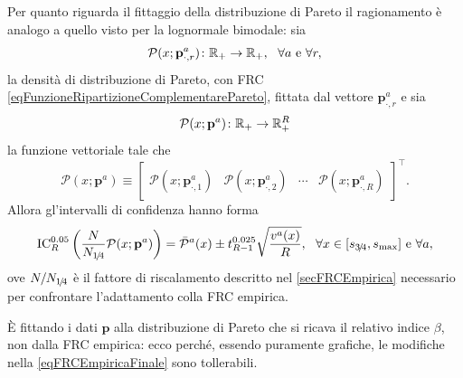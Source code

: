                 Per quanto riguarda il fittaggio della distribuzione di Pareto il ragionamento è analogo a quello visto per la lognormale bimodale: sia
                \begin{equation*}
                    \mathcal P(x;\mathbf p^a_{\cdot,r})\colon\mathbb R_+\to\mathbb R_+,
                    \ \ \forall a\text{ e }\forall r,
                \end{equation*}
                la densità di distribuzione di Pareto, con FRC \cref{eqFunzioneRipartizioneComplementarePareto}, fittata dal vettore \(\mathbf p^a_{\cdot,r}\) e sia
                \begin{equation*}
                    \mathcal P(x;\mathbf p^a)\colon\mathbb R_+\to\mathbb R_+^R
                \end{equation*}
                la funzione vettoriale tale che
                \begin{equation*}
                    \mathcal P(x;\mathbf p^a)\equiv
                    \begin{bmatrix}
                        \mathcal P(x;\mathbf p^a_{\cdot,1})&
                        \mathcal P(x;\mathbf p^a_{\cdot,2})&
                        \cdots&
                        \mathcal P(x;\mathbf p^a_{\cdot,R})
                    \end{bmatrix}^\top.
                \end{equation*}
                Allora gl'intervalli di confidenza hanno forma
                \begin{equation*}
                    \operatorname{IC}_R^{0.05}\left(\frac N{N_{1\hspace{-0.15em}/\hspace{-0.15em}4}}\mathcal P(x;\mathbf p^a)\right)
                    =\bar{\mathcal P}^a(x)\pm t^{0.025}_{R-1}\sqrt{\frac{v^a(x)}R},
                    \ \ \forall x\in[s_{3\hspace{-0.15em}/\hspace{-0.15em}4},s_{\max}]\text{ e }\forall a,
                \end{equation*}
                ove \(N/N_{1\hspace{-0.15em}/\hspace{-0.15em}4}\) è il fattore di riscalamento descritto nel \cref{secFRCEmpirica} necessario per confrontare l'adattamento colla FRC empirica.

                \begin{oss}
                    È fittando i dati \(\mathbf p\) alla distribuzione di Pareto che si ricava il relativo indice \(\beta\), non dalla FRC empirica: ecco perché,  essendo puramente grafiche, le modifiche nella \cref{eqFRCEmpiricaFinale} sono tollerabili.
                \end{oss}
        
